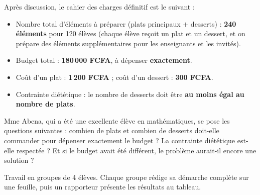 \documentclass[11pt]{article}
\newcounter{popsec}
\newcounter{popsub}
\newcommand{\courssub}[1]{%
  \stepcounter{popsub}%
  \par\vspace{9pt}\noindent{\popxbold\fontsize{11.5}{13}\selectfont\color{popink}{\color{poporange}\thepopsec.\thepopsub}\hspace{6pt}#1}\par\nopagebreak\vspace{4pt}
}
\begin{document}
Après discussion, le cahier des charges définitif est le suivant :

\begin{aretenir}
\begin{itemize}
\item Nombre total d'éléments à préparer (plats principaux $+$ desserts) : \textbf{240 éléments} pour 120 élèves (chaque élève reçoit un plat et un dessert, et on prépare des éléments supplémentaires pour les enseignants et les invités).
\item Budget total : \textbf{180\,000 FCFA}, à dépenser \textbf{exactement}.
\item Coût d'un plat : \textbf{1\,200 FCFA} ; coût d'un dessert : \textbf{300 FCFA}.
\item Contrainte diététique : le nombre de desserts doit être \textbf{au moins égal au nombre de plats}.
\end{itemize}
\end{aretenir}

Mme Abena, qui a été une excellente élève en mathématiques, se pose les questions suivantes : combien de plats et combien de desserts doit-elle commander pour dépenser exactement le budget ? La contrainte diététique est-elle respectée ? Et si le budget avait été différent, le problème aurait-il encore une solution ?

\courssub{Consignes}

Travail en groupes de 4 élèves. Chaque groupe rédige sa démarche complète sur une feuille, puis un rapporteur présente les résultats au tableau.
\end{document}
